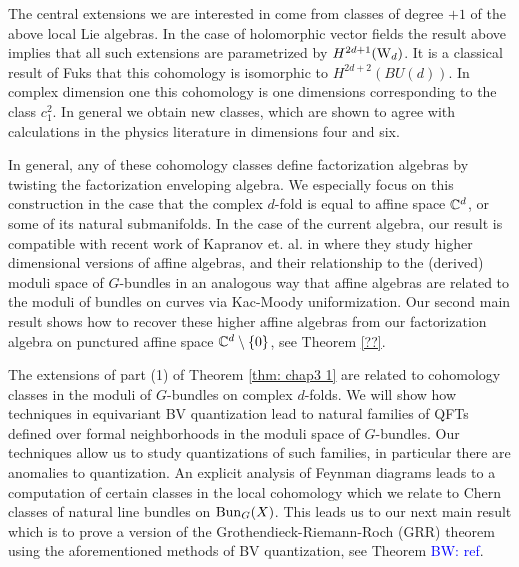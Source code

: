 \documentclass[10pt]{amsart}
\def\brian{\textcolor{blue}{BW: }\textcolor{blue}}
\begin{document}
The central extensions we are interested in come from classes of degree $+1$ of the above local Lie algebras.
In the case of holomorphic vector fields the result above implies that all such extensions are parametrized by $H^{2d+1}({\rm W}_d)$. 
It is a classical result of Fuks \cite{Fuks} that this cohomology is isomorphic to $H^{2d+2}(BU(d))$. 
In complex dimension one this cohomology is one dimensions corresponding to the class $c_1^2$. 
In general we obtain new classes, which are shown to agree with calculations in the physics 
literature in dimensions four and six. 

In general, any of these cohomology classes define factorization algebras by twisting the factorization enveloping algebra. 
We especially focus on this construction in the case that the complex $d$-fold is equal to affine space $\mathbb C^d$, or some of its natural submanifolds.
In the case of the current algebra, our result is compatible with recent work of Kapranov et. al. in \cite{FHK} where they study higher dimensional versions of affine algebras, and their relationship to the (derived) moduli space of $G$-bundles in an analogous way that affine algebras are related to the moduli of bundles on curves via Kac-Moody uniformization.  
Our second main result shows how to recover these higher affine algebras from our factorization algebra on punctured affine space $\mathbb C^d \setminus\{0\}$, see Theorem \ref{??}.

The extensions of part (1) of Theorem \ref{thm: chap3 1} are related to cohomology classes in the moduli of $G$-bundles on complex $d$-folds.
We will show how techniques in equivariant BV quantization lead to natural families of QFTs defined over formal neighborhoods in the moduli space of $G$-bundles. 
Our techniques allow us to study quantizations of such families, in particular there are anomalies to quantization. 
An explicit analysis of Feynman diagrams leads to a computation of certain classes in the local cohomology which we relate to Chern classes of natural line bundles on ${\rm Bun}_G(X)$.
This leads us to our next main result which is to prove a version of the Grothendieck-Riemann-Roch (GRR) theorem using the aforementioned methods of BV quantization, see Theorem \brian{ref}.

\end{document}
